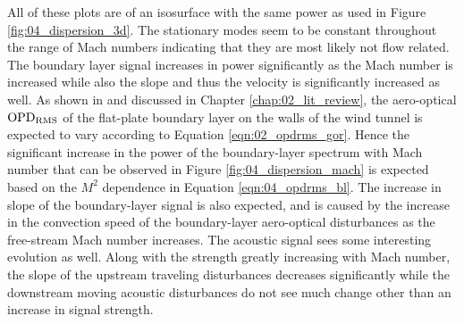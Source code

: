 All of these plots are of an isosurface with the same power as used in Figure \ref{fig:04_dispersion_3d}.
The stationary modes seem to be constant throughout the range of Mach numbers indicating that they are most likely not flow related.
The boundary layer signal increases in power significantly as the Mach number is increased while also the slope and thus the velocity is significantly increased as well.
As shown in  and discussed in Chapter \ref{chap:02_lit_review}, the aero-optical $\operatorname{OPD_{RMS}}$ of the flat-plate boundary layer on the walls of the wind tunnel is expected to vary according to Equation \ref{eqn:02_opdrms_gor}.
Hence the significant increase in the power of the boundary-layer spectrum with Mach number that can be observed in Figure \ref{fig:04_dispersion_mach} is expected based on the $M^2$ dependence in Equation \ref{eqn:04_opdrms_bl}.
The increase in slope of the boundary-layer signal is also expected, and is caused by the increase in the convection speed of the boundary-layer aero-optical disturbances as the free-stream Mach number increases.
The acoustic signal sees some interesting evolution as well.
Along with the strength greatly increasing with Mach number, the slope of the upstream traveling disturbances decreases significantly while the downstream moving acoustic disturbances do not see much change other than an increase in signal strength.

